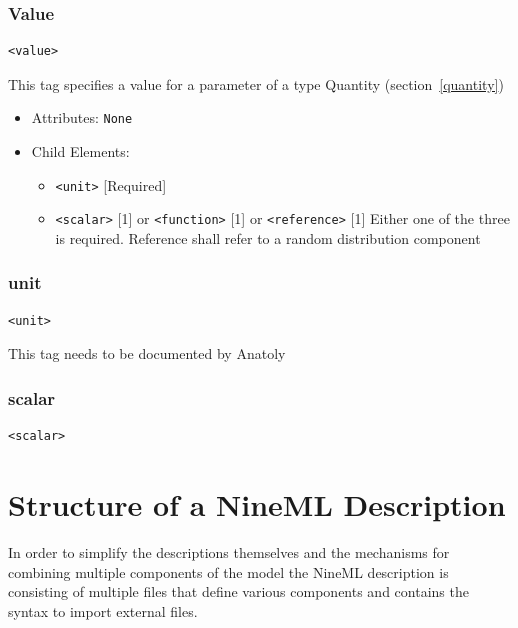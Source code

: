 \documentclass{article}
\begin{document}
\subsubsection{Value}
%
\begin{lstlisting}
<value>
\end{lstlisting}

This tag specifies a value for a parameter of a type Quantity
(section~\ref{quantity})

\begin{itemize}
\item Attributes: \texttt{None}

\item Child Elements:
%
\begin{itemize}
\item \verb|<unit>| {[}Required{]}
\item \verb|<scalar>| {[}1{]} or \verb|<function>| {[}1{]} or
\verb|<reference>| {[}1{]} Either one of the three is required. Reference
shall refer to a random distribution component
\end{itemize}

\end{itemize}

\subsubsection{unit}
%
\begin{lstlisting}
<unit>
\end{lstlisting}

This tag needs to be documented by Anatoly

\subsubsection{scalar}
%
\begin{lstlisting}
<scalar>
\end{lstlisting}

\newpage

\section{Structure of a NineML Description}

In order to simplify the descriptions themselves and the mechanisms for
combining multiple components of the model the NineML description
is consisting of multiple files that define various components and
contains the syntax to import external files.
\end{document}
